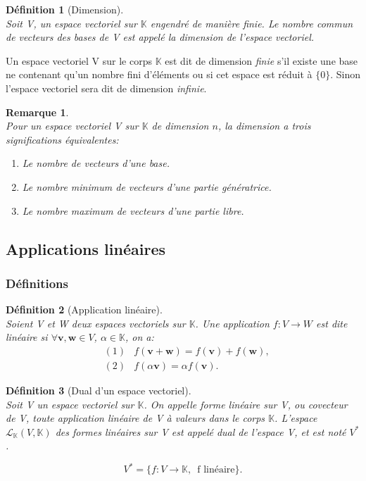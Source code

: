 \documentclass[11pt,a4paper,oneside]{book}
\newtheorem{defi}{Définition}[chapter]
\newtheorem{rem}{Remarque}[chapter]
\def\K{\mathbb K}
\def\L{\mathcal L}
\def\v{\mathbf v}
\def\w{\mathbf w}
\begin{document}
\begin{defi}[Dimension]
	\emph{\\}
	Soit V, un espace vectoriel sur $\K$ engendré de manière finie. Le nombre commun de vecteurs des bases de V est appelé la dimension de l'espace vectoriel.
\end{defi}
Un espace vectoriel V sur le corps $\K$ est dit de dimension \textit{finie} s'il existe une base ne contenant qu'un
nombre fini d'éléments ou si cet espace est réduit à $\{0\}$. Sinon l'espace vectoriel sera dit de dimension
\textit{infinie}.
\begin{rem}
\emph{\\}
Pour un espace vectoriel V sur $ \K $ de dimension $ n $, la dimension a trois significations
équivalentes:
\begin{enumerate}
\item
Le nombre de vecteurs d’une base.
\item
Le nombre minimum de vecteurs d’une partie génératrice.
\item
Le nombre maximum de vecteurs d’une partie libre.
\end{enumerate}

\end{rem}

\subsection{Applications linéaires}
\subsubsection{Définitions}
\begin{defi}[Application linéaire]
	\emph{\\}
Soient V et W deux espaces vectoriels sur $ \K $. Une application  $ f :V\rightarrow W$ est dite linéaire si $ \forall \v,\w\in V $,  $ \alpha \in \K $, on a:
	\begin{eqnarray}
		&(1)& f(\v+\w) = f(\v) + f(\w),\nonumber\\
		&(2)& f(\alpha \v )=\alpha f(\v).\nonumber	
	\end{eqnarray}	
\end{defi}
\begin{defi}[Dual d'un espace vectoriel]
	\emph{\\}
	Soit V un espace vectoriel sur $ \K $. On appelle forme linéaire sur V, ou \textit{covecteur} de V, toute application linéaire de V à valeurs dans le corps $ \K $.  L’espace $ \L_{\K} (V,\K) $ des formes
	linéaires sur V est appelé \textit{dual} de l’espace V, et est noté $ V^{*} $.
	
	\begin{equation}
	V^{*}=\{f: V\longrightarrow\K,\, \mbox{ f linéaire}\}.
	\end{equation}
\end{defi}
\end{document}
